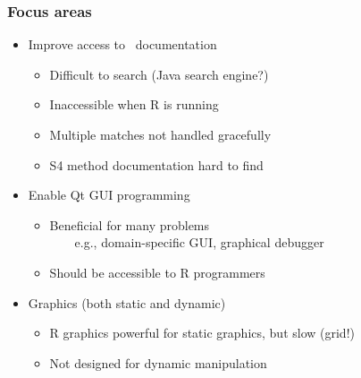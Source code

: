 \documentclass[compress]{beamer}
\begin{document}
\begin{frame}
  \frametitle{Focus areas}
  \begin{itemize}
  \item Improve access to \R\ documentation
    \begin{itemize}
    \item Difficult to search (Java search engine?)
    \item Inaccessible when R is running
    \item Multiple matches not handled gracefully
    \item S4 method documentation hard to find
    \end{itemize}
  \item Enable Qt GUI programming
    \begin{itemize}
    \item Beneficial for many problems \\ 
      ~~~~e.g., domain-specific GUI, graphical debugger
    \item Should be accessible to R programmers
    \end{itemize}
  \item Graphics (both static and dynamic)
    \begin{itemize}
    \item R graphics powerful for static graphics, but slow (grid!)
    \item Not designed for dynamic manipulation 
    \end{itemize}
  \end{itemize}
\end{frame}




\end{document}

